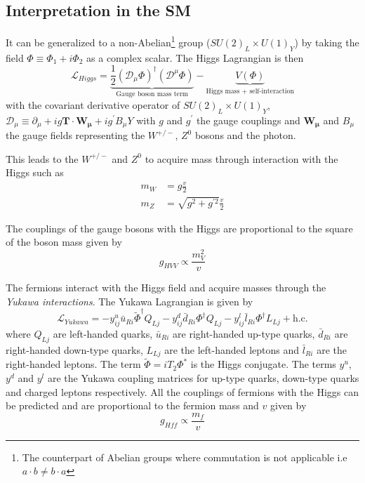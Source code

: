 \subsection{Interpretation in the SM}
\label{sec:HiggsSM}

It can be generalized to a non-Abelian\footnote{The counterpart of Abelian groups where commutation is not applicable i.e $a \cdot b \neq b \cdot a$} group ($SU(2)_{L} \times U(1)_{Y}$) by taking the field $\Phi \equiv \Phi_1+i\Phi_2$ as a complex scalar. The Higgs Lagrangian is then
\begin{equation}
  \mathcal{L}_{Higgs} = \underbrace{\frac{1}{2}(\mathcal{D}_{\mu}\Phi)^{\dagger}(\mathcal{D}^{\mu}\Phi)}_{\text{Gauge boson mass term}} - \underbrace{V(\Phi)}_{\text{Higgs mass + self-interaction}}
\end{equation}
with the covariant derivative operator of $SU(2)_{L} \times U(1)_{Y}$, $\mathcal{D}_{\mu} \equiv \partial_{\mu} + ig\mathbf{T} \cdot \mathbf{W_{\mu}} + ig^{\prime} B_{\mu}Y$ with $g$ and $g^{\prime}$ the gauge couplings and $\mathbf{W_{\mu}}$ and $B_{\mu}$ the gauge fields representing the $W^{+/-}$, $Z^0$ bosons and the photon.

This leads to the $W^{+/-}$ and $Z^0$ to acquire mass through interaction with the Higgs such as
\begin{equation}
  \begin{aligned}
    m_{W} &= g\frac{v}{2}\\
    m_{Z} &= \sqrt{g^2 + g^{\prime 2}}\frac{v}{2}
  \end{aligned}
\end{equation}

The couplings of the gauge bosons with the Higgs are proportional to the square of the boson mass given by
\begin{equation}
  g_{HVV} \propto \frac{m_V^2}{v}
\end{equation}

The fermions interact with the Higgs field and acquire masses through the \textit{Yukawa interactions}. The Yukawa Lagrangian is given by \cite{ILC_TDR_Vol2}
\begin{equation}
  \mathcal{L}_{Yukawa} = - y^u_{ij}\bar{u}_{Ri}\widetilde{\Phi}^{\dagger}Q_{Lj} - y^d_{ij}\bar{d}_{Ri}\Phi^{\dagger}Q_{Lj} - y^l_{ij}\bar{l}_{Ri}\Phi^{\dagger}L_{Lj} + \text{h.c}.
\end{equation}
where $Q_{Lj}$ are left-handed quarks, $\bar{u}_{Ri}$ are right-handed up-type quarks, $\bar{d}_{Ri}$ are right-handed down-type quarks, $L_{Lj}$ are the left-handed leptons and $\bar{l}_{Ri}$ are the right-handed leptons. The term $\widetilde{\Phi} = iT_2\Phi^{*}$ is the Higgs conjugate. The terms $y^u$, $y^d$ and $y^l$ are the Yukawa coupling matrices for up-type quarks, down-type quarks and charged leptons respectively. All the couplings of fermions with the Higgs can be predicted and are proportional to the fermion mass and $v$ given by
\begin{equation}
  g_{Hff} \propto \frac{m_f}{v}
\end{equation}

